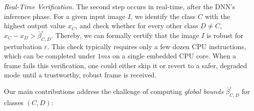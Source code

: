 \textit{Real-Time Verification.} The second step occurs in real-time, after the DNN's inference phase. For a given input image $I$, we identify the class $C$ with the highest output value $x_C$, and check whether for every other class $D \neq C$, 
$x_C - x_D > \bar{\beta}^\varepsilon_{C,D}$. 
Thereby, we can formally certify that the image $I$ is robust for perturbation $\varepsilon$.
%
This check typically requires only a few dozen CPU instructions, which can be completed under $1 ms$ on a single embedded CPU core. When a frame fails this verification, one could either skip it or revert to a safer, degraded mode until a trustworthy, robust frame is received.

Our main contributions address the challenge of computing {\em global bounds} $\bar{\beta}^\varepsilon_{C,D}$ for classes $(C,D)$:

